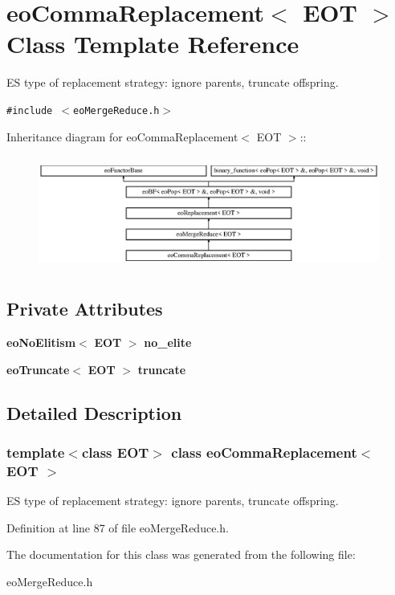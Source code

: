 \section{eo\-Comma\-Replacement$<$ EOT $>$ Class Template Reference}
\label{classeo_comma_replacement}
ES type of replacement strategy: ignore parents, truncate offspring.  


{\tt \#include $<$eo\-Merge\-Reduce.h$>$}

Inheritance diagram for eo\-Comma\-Replacement$<$ EOT $>$::\begin{figure}[H]
\begin{center}
\leavevmode
\includegraphics[height=3.76344cm]{classeo_comma_replacement}
\end{center}
\end{figure}
\subsection*{Private Attributes}
\begin{CompactItemize}
\item 
{\bf eo\-No\-Elitism}$<$ {\bf EOT} $>$ {\bf no\_\-elite}\label{classeo_comma_replacement_r0}

\item 
{\bf eo\-Truncate}$<$ {\bf EOT} $>$ {\bf truncate}\label{classeo_comma_replacement_r1}

\end{CompactItemize}


\subsection{Detailed Description}
\subsubsection*{template$<$class EOT$>$ class eo\-Comma\-Replacement$<$ EOT $>$}

ES type of replacement strategy: ignore parents, truncate offspring. 



Definition at line 87 of file eo\-Merge\-Reduce.h.

The documentation for this class was generated from the following file:\begin{CompactItemize}
\item 
eo\-Merge\-Reduce.h\end{CompactItemize}
